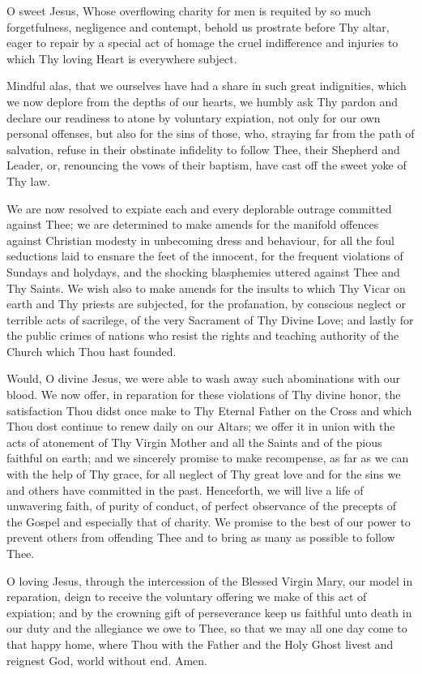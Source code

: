 O sweet Jesus, Whose overflowing charity for men is requited by so
much forgetfulness, negligence and contempt, behold us prostrate
before Thy altar, eager to repair by a special act of homage the cruel
indifference and injuries to which Thy loving Heart is everywhere
subject. 

Mindful alas, that we ourselves have had a share in such great
indignities, which we now deplore from the depths of our hearts, we
humbly ask Thy pardon and declare our readiness to atone by voluntary
expiation, not only for our own personal offenses, but also for the
sins of those, who, straying far from the path of salvation, refuse in
their obstinate infidelity to follow Thee, their Shepherd and Leader,
or, renouncing the vows of their baptism, have cast off the sweet
yoke of Thy law. 

We are now resolved to expiate each and every deplorable outrage
committed against Thee; we are determined to make amends for the
manifold offences against Christian modesty in unbecoming dress and
behaviour, for all the foul seductions laid to ensnare the feet of the
innocent, for the frequent violations of Sundays and holydays, and the
shocking blasphemies uttered against Thee and Thy Saints. We wish also
to make amends for the insults to which Thy Vicar on earth and Thy
priests are subjected, for the profanation, by conscious neglect or
terrible acts of sacrilege, of the very Sacrament of Thy Divine Love;
and lastly for the public crimes of nations who resist the rights and
teaching authority of the Church which Thou hast founded. 

Would, O divine Jesus, we were able to wash away such abominations with our blood.
We now offer, in reparation for these violations of Thy divine honor,
the satisfaction Thou didst once make to Thy Eternal Father on the Cross and
which Thou dost continue to renew daily on our Altars; we offer it in
union with the acts of atonement of Thy Virgin Mother and all the
Saints and of the pious faithful on earth; and we sincerely promise to
make recompense, as far as we can with the help of Thy grace, for all
neglect of Thy great love and for the sins we and others have
committed in the past. Henceforth, we will live a life of unwavering
faith, of purity of conduct, of perfect observance of the precepts of
the Gospel and especially that of charity. We promise to the best of
our power to prevent others from offending Thee and to bring as many
as possible to follow Thee. 

O loving Jesus, through the intercession of the Blessed Virgin Mary,
our model in reparation, deign to receive the voluntary offering we
make of this act of expiation; and by the crowning gift of
perseverance keep us faithful unto death in our duty and the
allegiance we owe to Thee, so that we may all one day come to that
happy home, where Thou with the Father and the Holy Ghost livest and
reignest God, world without end. Amen. 

